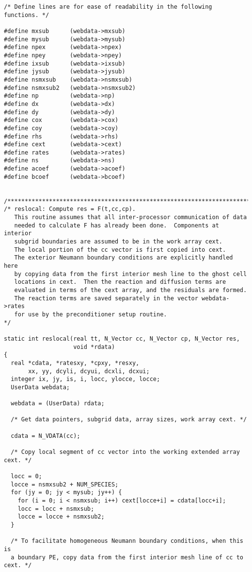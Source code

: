 \documentclass[11pt]{article}
\begin{document}
\begin{verbatim}
/* Define lines are for ease of readability in the following functions. */

#define mxsub      (webdata->mxsub)
#define mysub      (webdata->mysub)
#define npex       (webdata->npex)
#define npey       (webdata->npey)
#define ixsub      (webdata->ixsub)
#define jysub      (webdata->jysub)
#define nsmxsub    (webdata->nsmxsub)
#define nsmxsub2   (webdata->nsmxsub2)
#define np         (webdata->np)
#define dx         (webdata->dx)
#define dy         (webdata->dy)
#define cox        (webdata->cox)
#define coy        (webdata->coy)
#define rhs        (webdata->rhs)
#define cext       (webdata->cext)
#define rates      (webdata->rates)
#define ns         (webdata->ns)
#define acoef      (webdata->acoef)
#define bcoef      (webdata->bcoef)


/*************************************************************************/
/* reslocal: Compute res = F(t,cc,cp).
   This routine assumes that all inter-processor communication of data
   needed to calculate F has already been done.  Components at interior
   subgrid boundaries are assumed to be in the work array cext.
   The local portion of the cc vector is first copied into cext.
   The exterior Neumann boundary conditions are explicitly handled here
   by copying data from the first interior mesh line to the ghost cell
   locations in cext.  Then the reaction and diffusion terms are
   evaluated in terms of the cext array, and the residuals are formed.
   The reaction terms are saved separately in the vector webdata->rates
   for use by the preconditioner setup routine.                          */

static int reslocal(real tt, N_Vector cc, N_Vector cp, N_Vector res,
                    void *rdata)
{
  real *cdata, *ratesxy, *cpxy, *resxy,
       xx, yy, dcyli, dcyui, dcxli, dcxui;
  integer ix, jy, is, i, locc, ylocce, locce;
  UserData webdata;

  webdata = (UserData) rdata;
  
  /* Get data pointers, subgrid data, array sizes, work array cext. */

  cdata = N_VDATA(cc);

  /* Copy local segment of cc vector into the working extended array cext. */

  locc = 0;
  locce = nsmxsub2 + NUM_SPECIES;
  for (jy = 0; jy < mysub; jy++) {
    for (i = 0; i < nsmxsub; i++) cext[locce+i] = cdata[locc+i];
    locc = locc + nsmxsub;
    locce = locce + nsmxsub2;
  }

  /* To facilitate homogeneous Neumann boundary conditions, when this is
  a boundary PE, copy data from the first interior mesh line of cc to cext. */


\end{verbatim}
\end{document}
